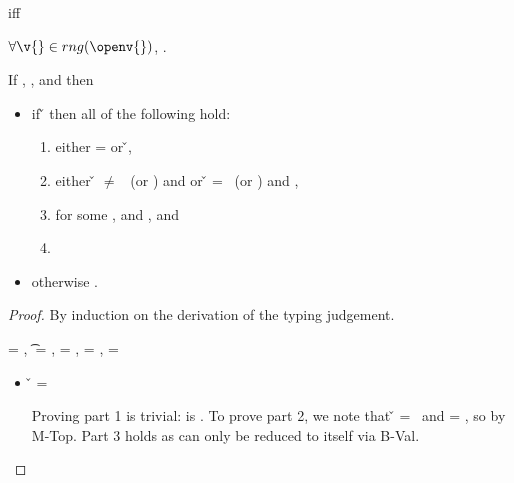 \begin{definition} \label{definition:isconsistent}
  \isconsistent{\openv{}}
  iff

  $\forall \v{} \in rng(\openv{})$, \consistentwith{\v{}}{\openv{}}.
\end{definition}

\begin{lemma} \label{lemma:soundness}
If \judgement{\propenv{}}{\hastype{\e{}}{\t{}}}{\filterset{\thenprop{\prop{}}}{\elseprop{\prop{}}}}{\object{}},
\satisfies{\openv{}}{\propenv{}}, and 
\isconsistent{\openv{}}
then
\begin{itemize}
  \item
    if
    \opsem {\openv{}} {\e{}} {\v{}} 
then all of the following hold:
\begin{enumerate}
  \item either \object{} = \emptyobject{} or \inopenv {\openv{}} {\object{}} {\v{}},
  \item either \v{} $\not=$ \false\ (or \nil) and {\satisfies{\openv{}}{\thenprop{\prop{}}}} or 
               \v{}       = \false\ (or \nil) and {\satisfies{\openv{}}{\elseprop{\prop{}}}},
  \item \judgement{}{\hastype{\v{}}{\t{}}}{\filterset{\thenprop{\propp{}}}{\elseprop{\propp{}}}}{\objectp{}}
        for some \thenprop{\propp{}}, \elseprop{\propp{}} and {\objectp{}}, and
      \item \consistentwith{\v{}}{\openv{}}
\end{enumerate}

  \item
otherwise \opsem {\openv{}} {\e{}} {\errorvalv{}}.
\end{itemize}


\begin{proof}
By induction on the derivation of the typing judgement.

\begin{case}[T-True]
\e{} = \true, \t{} = \True, \thenprop{\prop{}} = \topprop{}, \elseprop{\prop{}} = \botprop{}, \object{} = \emptyobject{}

\begin{itemize}
  \item[] 
    \begin{subcase}[B-Val]
      \v{} = \true{}

Proving part 1 is trivial: \object{} is \emptyobject. 
To prove part 2, we note that \v{} = \true\ 
and \thenprop{\prop{}} = \topprop{}, so \satisfies{\openv{}}{\thenprop{\prop{}}} by M-Top.
Part 3 holds as \e{} can only be reduced to itself via B-Val.
\end{subcase}


\end{itemize}
\end{case}
\end{proof}
\end{lemma}
